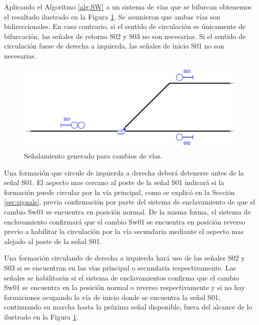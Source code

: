     Aplicando el Algoritmo \ref{alg:SW} a un sistema de vías que se bifurcan obtenemos el resultado ilustrado en la Figura \ref{fig:signal_swithces}. Se asumieron que ambas vías son bidireccionales. En caso contrario, si el sentido de circulación es únicamente de bifurcación, las señales de retorno S02 y S03 no son necesarias. Si el sentido de circulación fuese de derecha a izquierda, las señales de inicio S01 no son necesarias.
    
    \begin{figure}[H]
        \centering
        \includegraphics[width=1\textwidth]{Figuras/switches.PNG}
        \centering\caption{Señalamiento generado para cambios de vías.}
        \label{fig:signal_swithces}
    \end{figure}
    
    Una formación que circule de izquierda a derecha deberá detenerse antes de la señal S01. El aspecto mas cercano al poste de la señal S01 indicará si la formación puede circular por la vía principal, como se explicó en la Sección \ref{sec:signals}, previa confirmación por parte del sistema de enclavamiento de que el cambio Sw01 se encuentra en posición normal. De la misma forma, el sistema de enclavamiento confirmará que el cambio Sw01 se encuentra en posición reverso previo a habilitar la circulación por la vía secundaria mediante el aspecto mas alejado al poste de la señal S01.

    Una formación circulando de derecha a izquierda hará uso de las señales S02 y S03 si se encuentran en las vías principal o secundaria respectivamente. Las señales se habilitarán si el sistema de enclavamientos confirma que el cambio Sw01 se encuentra en la posición normal o reverso respectivamente y si no hay formaciones ocupando la vía de inicio donde se encuentra la señal S01, continuando su marcha hasta la próxima señal disponible, fuera del alcance de lo ilustrado en la Figura \ref{fig:signal_swithces}.    